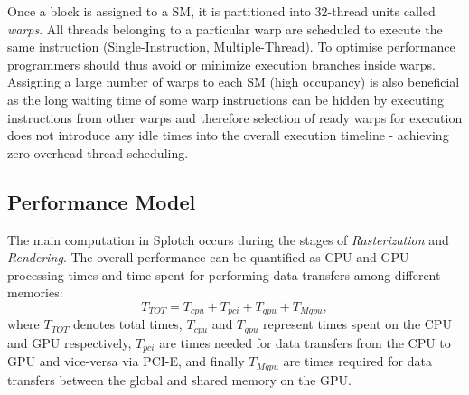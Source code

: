 \documentclass[1p]{elsarticle}
\begin{document}
Once a block is assigned to a SM, it is partitioned into 32-thread units called {\em warps}. All threads belonging to a particular warp are scheduled to execute the same instruction (Single-Instruction, Multiple-Thread). To optimise performance programmers should thus avoid or minimize execution branches inside warps. Assigning a large number of warps to each SM (high occupancy) is also beneficial as the long waiting time of some warp instructions can be hidden by executing instructions from other warps and therefore selection of ready warps for execution does not introduce any idle times into the overall execution timeline - achieving zero-overhead thread scheduling. 

\subsection{Performance Model}
\label{sec:model}

The main computation in Splotch occurs during the stages of {\it Rasterization} and {\it Rendering}.
The overall performance can be quantified as CPU and GPU processing times 
and time spent for performing data transfers among different memories:
\begin{equation}\label{Ts}
T_{TOT} = T_{cpu} + T_{pci} + T_{gpu} + T_{Mgpu},
\end{equation}
where $T_{TOT}$ denotes total times, 
$T_{cpu}$ and $T_{gpu}$ represent times spent on the CPU and GPU respectively, $T_{pci}$ are times needed for data transfers from the CPU to GPU and vice-versa via PCI-E, and finally $T_{Mgpu}$ are times required for data transfers between the global and shared memory on the GPU. 

\end{document}
